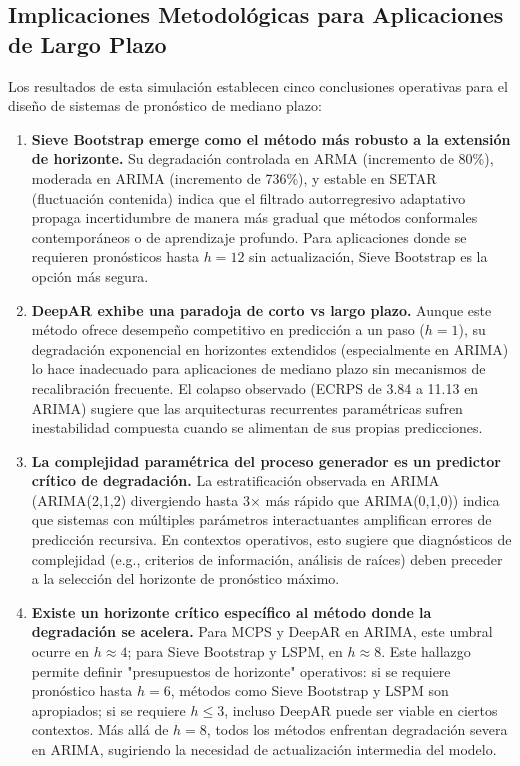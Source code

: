 \subsection{Implicaciones Metodológicas para Aplicaciones de Largo Plazo}
\label{subsec:implicaciones_multi_paso}

Los resultados de esta simulación establecen cinco conclusiones operativas para el diseño de sistemas de pronóstico de mediano plazo:

\begin{enumerate}
\item \textbf{Sieve Bootstrap emerge como el método más robusto a la extensión de horizonte.} Su degradación controlada en ARMA (incremento de 80\%), moderada en ARIMA (incremento de 736\%), y estable en SETAR (fluctuación contenida) indica que el filtrado autorregresivo adaptativo propaga incertidumbre de manera más gradual que métodos conformales contemporáneos o de aprendizaje profundo. Para aplicaciones donde se requieren pronósticos hasta $h=12$ sin actualización, Sieve Bootstrap es la opción más segura.

\item \textbf{DeepAR exhibe una paradoja de corto vs largo plazo.} Aunque este método ofrece desempeño competitivo en predicción a un paso ($h=1$), su degradación exponencial en horizontes extendidos (especialmente en ARIMA) lo hace inadecuado para aplicaciones de mediano plazo sin mecanismos de recalibración frecuente. El colapso observado (ECRPS de 3.84 a 11.13 en ARIMA) sugiere que las arquitecturas recurrentes paramétricas sufren inestabilidad compuesta cuando se alimentan de sus propias predicciones.

\item \textbf{La complejidad paramétrica del proceso generador es un predictor crítico de degradación.} La estratificación observada en ARIMA (ARIMA(2,1,2) divergiendo hasta 3× más rápido que ARIMA(0,1,0)) indica que sistemas con múltiples parámetros interactuantes amplifican errores de predicción recursiva. En contextos operativos, esto sugiere que diagnósticos de complejidad (e.g., criterios de información, análisis de raíces) deben preceder a la selección del horizonte de pronóstico máximo.

\item \textbf{Existe un horizonte crítico específico al método donde la degradación se acelera.} Para MCPS y DeepAR en ARIMA, este umbral ocurre en $h \approx 4$; para Sieve Bootstrap y LSPM, en $h \approx 8$. Este hallazgo permite definir "presupuestos de horizonte" operativos: si se requiere pronóstico hasta $h=6$, métodos como Sieve Bootstrap y LSPM son apropiados; si se requiere $h \leq 3$, incluso DeepAR puede ser viable en ciertos contextos. Más allá de $h=8$, todos los métodos enfrentan degradación severa en ARIMA, sugiriendo la necesidad de actualización intermedia del modelo.


\end{enumerate}
